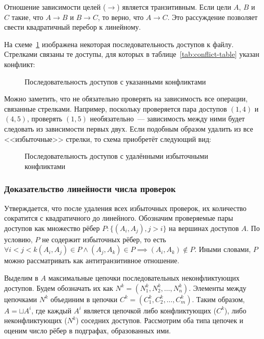 Отношение зависимости целей ($\rightarrow$) является транзитивным. Если цели $A$, $B$ и $C$ такие, что $A \rightarrow B$ и $B \rightarrow C$, то верно, что $A \rightarrow C$. Это рассуждение позволяет свести квадратичный перебор к линейному.

На схеме~\ref{fig:all-conflicts} изображена некоторая последовательность доступов к файлу. Стрелками связаны те доступы, для которых в таблице~\ref{tab:conflict-table} указан конфликт:

\begin{figure}[H]
    \centering
    
    \caption{Последовательность доступов с указанными конфликтами}
    \label{fig:all-conflicts}
\end{figure}

Можно заметить, что не обязательно проверять на зависимость все операции, связанные стрелками. Например, поскольку проверяется пара доступов $(1, 4)$ и $(4, 5)$, проверять $(1, 5)$ необязательно~--- зависимость между ними будет следовать из зависимости первых двух. Если подобным образом удалить из все <<избыточные>> стрелки, то схема приобретёт следующий вид:

\begin{figure}[H]
    \centering
    
    \caption{Последовательность доступов с удалёнными избыточными конфликтами}
    \label{fig:stripped-conflicts}
\end{figure}

\subsubsection{Доказательство линейности числа проверок}

Утверждается, что после удаления всех избыточных проверок, их количество сократится с квадратичного до линейного. Обозначим проверяемые пары доступов как множество рёбер $P:\{(A_i, A_j), j>i\}$ на вершинах доступов $A$. По условию, $P$ не содержит избыточных рёбер, то есть $\forall i < j < k (A_i, A_j) \in P \wedge (A_j, A_k) \in P \implies (A_i, A_k) \notin P$. Иными словами, $P$ можно рассматривать как антитранзитивное отношение.

Выделим в $A$ максимальные цепочки последовательных неконфликтующих доступов. Будем обозначать их как $N^k = (N^k_1, N^k_2, \ldots, N^k_n)$. Элементы между цепочками $N^k$ объединим в цепочки $C^k = (C^k_1, C^k_2, \ldots, C^k_m)$. Таким образом, $A = \sqcup A^i$, где каждый $A^i$ является цепочкой либо конфликтующих ($C^k$), либо неконфликтующих ($N^k$) соседних доступов. Рассмотрим оба типа цепочек и оценим число рёбер в подграфах, образованных ими.

